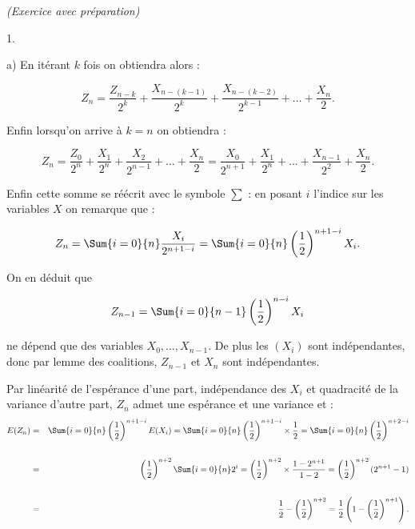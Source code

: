 \documentclass[11pt]{article}%
\begin{document}
\begin{exercice}{\it (Exercice avec préparation)}
\begin{noliste}{1.}
\begin{noliste}{a)}
 En itérant $k$ fois on obtiendra alors :
 
\[
 Z_{n} = \frac{ Z_{n-k} }{ 2^{k} } + \frac{ X_{n- (k-1)} }{ 2^{k} } +
\frac{ X_{n- (k-2) } }{ 2^{k-1} } + \dots + \frac{ X_{n} }{ 2 }. 
\]

 Enfin lorsqu'on arrive à $k = n$ on obtiendra : 
 
\[
 Z_{n} = \frac{ Z_{0} }{ 2^{n} } + \frac{ X_{1} }{ 2^{n} } + \frac{
X_{2} }{ 2^{n-1 } } + \dots + \frac{ X_{n} }{ 2 } = \frac{ X_{0} }{
2^{n + 1} } + \frac{ X_{1} }{ 2^{n} } + \dots + \frac{ X_{n-1} }{ 2^{2}
} + \frac{ X_{n} }{ 2 }. 
\]

 Enfin cette somme se réécrit avec le symbole $\sum$ : en posant $i$
l'indice sur les variables $X$ on remarque que : 
 
\[
 Z_{n} = \Sum{ i = 0 }{n} \frac{ X_{i} }{ 2^{ n + 1 - i } } = \Sum{ i =
0 }{n} \left( \frac{ 1 }{ 2 } \right)^{ n + 1 - i } X_{i}. 
\]

 \item On en déduit que
 
\[
 Z_{n-1} = \Sum{i = 0}{n-1} \left( \frac{ 1 }{ 2 } \right)^{ n - i }
X_{i} 
\]

 ne dépend que des variables $X_{0}, \dots, X_{n-1}$. De plus les
$(X_{i})$ sont indépendantes, donc par lemme des coalitions, $Z_{n-1}$
et $X_{n}$ sont indépendantes. \\

 \item Par linéarité de l'espérance d'une part, indépendance des
$X_{i}$ et quadracité de la variance d'autre part, $Z_{n}$ admet une
espérance et une variance et : 
 \begin{eqnarray*}
 E ( Z_{n} ) & = & \Sum{i = 0}{n} \left( \frac{ 1 }{ 2 } \right)^{ n +
1 - i } E ( X_{i} ) = \Sum{i = 0}{n} \left( \frac{ 1 }{ 2 } \right)^{ n
+ 1 - i } \times \frac{1}{2} = \Sum{i = 0}{n} \left( \frac{ 1 }{ 2 }
\right)^{ n + 2 - i } \\
\\
 & = & \left( \frac{ 1 }{ 2 } \right)^{n + 2} \Sum{i = 0}{n} 2^{i} =
\left( \frac{ 1 }{ 2 } \right)^{ n + 2 } \times \frac{ 1 - 2^{n + 1} }{
1 - 2 } = \left( \frac{ 1 }{ 2 } \right)^{ n + 2 } (2^{n + 1} - 1 ) \\
\\
 & = & \frac{ 1 }{ 2 } - \left( \frac{ 1 }{ 2 } \right)^{ n + 2 } =
\frac{ 1 }{ 2 } \left( 1 - \left( \frac{ 1 }{ 2 } \right)^{n + 1}
\right). 
 \end{eqnarray*}


\end{noliste}
\end{noliste}
\end{exercice}
\end{document}
